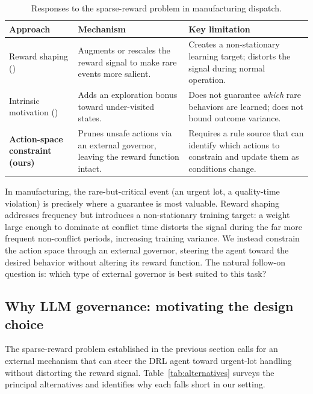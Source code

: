 \documentclass[10pt]{article}
\begin{document}
\begin{table}[thb]
\centering
\caption{Responses to the sparse-reward problem in manufacturing dispatch.}
\label{tab:sparse}
\setlength{\tabcolsep}{4pt}
\footnotesize
\begin{tabularx}{\columnwidth}{@{}p{2.1cm}XX@{}}
\hline
\textbf{Approach} & \textbf{Mechanism} & \textbf{Key limitation} \\ \hline
Reward shaping (\citeyear{ng1999})
                   & Augments or rescales the reward signal to make rare events more salient.
                   & Creates a non-stationary learning target;
                     distorts the signal during normal operation. \\[2pt]
Intrinsic motivation (\citeyear{pathak2017})
                   & Adds an exploration bonus toward under-visited states.
                   & Does not guarantee \emph{which} rare behaviors are learned;
                     does not bound outcome variance. \\[2pt]
\textbf{Action-space constraint (ours)}
                   & Prunes unsafe actions via an external governor,
                     leaving the reward function intact.
                   & Requires a rule source that can identify which actions
                     to constrain and update them as conditions change. \\ \hline
\end{tabularx}
\normalsize
\end{table}

In manufacturing, the rare-but-critical event (an urgent lot, a quality-time
violation) is precisely where a guarantee is most valuable. Reward shaping
addresses frequency but introduces a non-stationary training target: a weight
large enough to dominate at conflict time distorts the signal during the far
more frequent non-conflict periods, increasing training variance. We instead
constrain the action space through an external governor, steering the agent
toward the desired behavior without altering its reward function.
The natural follow-on question is: which type of external governor is best
suited to this task?

\subsection{Why LLM governance: motivating the design choice}
\label{sec:alternatives}

The sparse-reward problem established in the previous section calls for an
external mechanism that can steer the DRL agent toward urgent-lot handling
without distorting the reward signal.
Table~\ref{tab:alternatives} surveys the principal alternatives and identifies
why each falls short in our setting.
\end{document}
